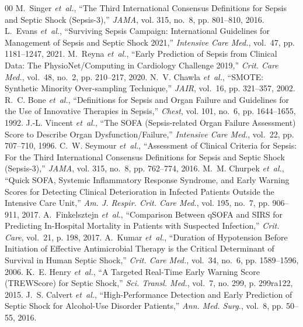 \documentclass[conference]{IEEEtran}
\begin{document}

{\footnotesize
\begin{thebibliography}{00}
M.~Singer \emph{et~al.}, ``The Third International Consensus Definitions for Sepsis and Septic Shock (Sepsis-3),'' \emph{JAMA}, vol. 315, no.~8, pp. 801--810, 2016.
L.~Evans \emph{et~al.}, ``Surviving Sepsis Campaign: International Guidelines for Management of Sepsis and Septic Shock 2021,'' \emph{Intensive Care Med.}, vol.~47, pp. 1181--1247, 2021.
M.~Reyna \emph{et~al.}, ``Early Prediction of Sepsis from Clinical Data: The PhysioNet/Computing in Cardiology Challenge 2019,'' \emph{Crit. Care Med.}, vol.~48, no.~2, pp. 210--217, 2020.
N.~V. Chawla \emph{et~al.}, ``SMOTE: Synthetic Minority Over-sampling Technique,'' \emph{JAIR}, vol.~16, pp. 321--357, 2002.
R.~C. Bone \emph{et~al.}, ``Definitions for Sepsis and Organ Failure and Guidelines for the Use of Innovative Therapies in Sepsis,'' \emph{Chest}, vol. 101, no.~6, pp. 1644--1655, 1992.
J.-L. Vincent \emph{et~al.}, ``The SOFA (Sepsis-related Organ Failure Assessment) Score to Describe Organ Dysfunction/Failure,'' \emph{Intensive Care Med.}, vol.~22, pp. 707--710, 1996.
C.~W. Seymour \emph{et~al.}, ``Assessment of Clinical Criteria for Sepsis: For the Third International Consensus Definitions for Sepsis and Septic Shock (Sepsis-3),'' \emph{JAMA}, vol. 315, no.~8, pp. 762--774, 2016.
\balance
{}
M.~M. Churpek \emph{et~al.}, ``Quick SOFA, Systemic Inflammatory Response Syndrome, and Early Warning Scores for Detecting Clinical Deterioration in Infected Patients Outside the Intensive Care Unit,'' \emph{Am. J. Respir. Crit. Care Med.}, vol. 195, no.~7, pp. 906--911, 2017.
A.~Finkelsztejn \emph{et~al.}, ``Comparison Between qSOFA and SIRS for Predicting In-Hospital Mortality in Patients with Suspected Infection,'' \emph{Crit. Care}, vol.~21, p. 198, 2017.
A.~Kumar \emph{et~al.}, ``Duration of Hypotension Before Initiation of Effective Antimicrobial Therapy is the Critical Determinant of Survival in Human Septic Shock,'' \emph{Crit. Care Med.}, vol.~34, no.~6, pp. 1589--1596, 2006.
K.~E. Henry \emph{et~al.}, ``A Targeted Real-Time Early Warning Score (TREWScore) for Septic Shock,'' \emph{Sci. Transl. Med.}, vol.~7, no. 299, p. 299ra122, 2015.
J.~S. Calvert \emph{et~al.}, ``High-Performance Detection and Early Prediction of Septic Shock for Alcohol-Use Disorder Patients,'' \emph{Ann. Med. Surg.}, vol.~8, pp. 50--55, 2016.

\end{thebibliography}}
\end{document}
